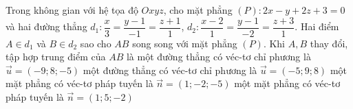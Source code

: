 \begin{ex}%
Trong không gian với hệ tọa độ $ Oxyz $, cho mặt phẳng $ (P) \colon 2x - y + 2z + 3 = 0 $ và hai đường thẳng $ d_1 \colon \dfrac{x}{3} = \dfrac{y-1}{-1} = \dfrac{z+1}{1}$, $ d_2 \colon \dfrac{x-2}{1} = \dfrac{y-1}{-2} = \dfrac{z + 3}{1} $. Hai điểm $ A \in d_1 $ và $ B \in d_2 $ sao cho $ AB $ song song với mặt phẳng $ (P) $. Khi $ A, B $ thay đổi, tập hợp trung điểm của $ AB $ là
	\choice
	{\True một đường thẳng có véc-tơ chỉ phương là $ \vec{u} = (-9;8;-5) $}
	{một đường thẳng có véc-tơ chỉ phương là $ \vec{u} = (-5;9;8) $}
	{một mặt phẳng có véc-tơ pháp tuyến là $ \vec{n} = (1;-2;-5) $}
	{một mặt phẳng có véc-tơ pháp tuyến là $ \vec{n} = (1;5;-2) $}
\end{ex}	
